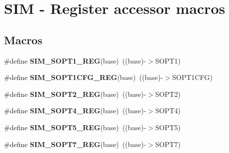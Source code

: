 \hypertarget{group__SIM__Register__Accessor__Macros}{}\section{S\+IM -\/ Register accessor macros}
\label{group__SIM__Register__Accessor__Macros}
\subsection*{Macros}
\begin{DoxyCompactItemize}
\item 
\#define {\bfseries S\+I\+M\+\_\+\+S\+O\+P\+T1\+\_\+\+R\+EG}(base)~((base)-\/$>$S\+O\+P\+T1)\hypertarget{group__SIM__Register__Accessor__Macros_ga3b7afc5db335a5be8aaa37f7fbecff72}{}\label{group__SIM__Register__Accessor__Macros_ga3b7afc5db335a5be8aaa37f7fbecff72}

\item 
\#define {\bfseries S\+I\+M\+\_\+\+S\+O\+P\+T1\+C\+F\+G\+\_\+\+R\+EG}(base)~((base)-\/$>$S\+O\+P\+T1\+C\+FG)\hypertarget{group__SIM__Register__Accessor__Macros_ga4c047f7ef6bc896bec677567db485e0c}{}\label{group__SIM__Register__Accessor__Macros_ga4c047f7ef6bc896bec677567db485e0c}

\item 
\#define {\bfseries S\+I\+M\+\_\+\+S\+O\+P\+T2\+\_\+\+R\+EG}(base)~((base)-\/$>$S\+O\+P\+T2)\hypertarget{group__SIM__Register__Accessor__Macros_ga49ff604bc1be3844a25f00a1a6b7649d}{}\label{group__SIM__Register__Accessor__Macros_ga49ff604bc1be3844a25f00a1a6b7649d}

\item 
\#define {\bfseries S\+I\+M\+\_\+\+S\+O\+P\+T4\+\_\+\+R\+EG}(base)~((base)-\/$>$S\+O\+P\+T4)\hypertarget{group__SIM__Register__Accessor__Macros_gaf236970c4ed2d9aa01898ca0f361b6e5}{}\label{group__SIM__Register__Accessor__Macros_gaf236970c4ed2d9aa01898ca0f361b6e5}

\item 
\#define {\bfseries S\+I\+M\+\_\+\+S\+O\+P\+T5\+\_\+\+R\+EG}(base)~((base)-\/$>$S\+O\+P\+T5)\hypertarget{group__SIM__Register__Accessor__Macros_gac3deed6e684a7bdf2dcb7559e1f183c0}{}\label{group__SIM__Register__Accessor__Macros_gac3deed6e684a7bdf2dcb7559e1f183c0}

\item 
\#define {\bfseries S\+I\+M\+\_\+\+S\+O\+P\+T7\+\_\+\+R\+EG}(base)~((base)-\/$>$S\+O\+P\+T7)\hypertarget{group__SIM__Register__Accessor__Macros_ga1859f3465bc7759ea1727d66791a4c27}{}\label{group__SIM__Register__Accessor__Macros_ga1859f3465bc7759ea1727d66791a4c27}


\end{DoxyCompactItemize}
